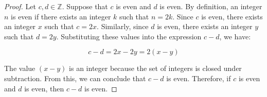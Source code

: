 \documentclass{article}
\begin{document}
\begin{enumerate}
          \begin{proof}
              Let $c, d \in \mathbb{Z}$. Suppose that $c$ is even and $d$ is even. By definition,
              an integer $n$ is even if there exists an integer $k$ such that $n = 2k$. Since $c$ is
              even, there exists an integer $x$ such that $c = 2x$. Similarly, since $d$ is even,
              there exists an integer $y$ such that $d = 2y$. Substituting these values into the
              expression $c - d$, we have:

              \[c - d = 2x - 2y = 2(x - y)\]

              The value $(x - y)$ is an integer because the set of integers is closed under
              subtraction. From this, we can conclude that $c - d$ is even. Therefore, if $c$
              is even and $d$ is even, then $c - d$ is even.
          \end{proof}

\end{enumerate}
\end{document}
